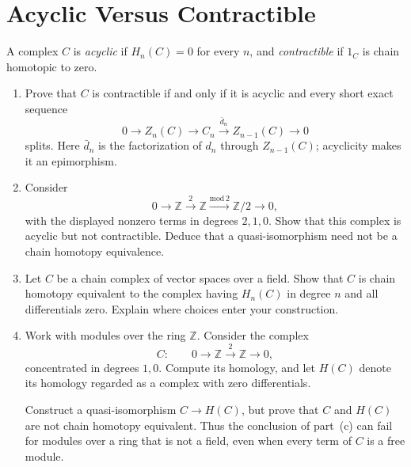 \documentclass[11pt]{article}
\newcommand{\Z}{\mathbb{Z}}
\begin{document}
\section{Acyclic Versus Contractible}
A complex \(C\) is \emph{acyclic} if \(H_n(C)=0\) for every \(n\), and
\emph{contractible} if \(1_C\) is chain homotopic to zero.
\begin{enumerate}
\item Prove that \(C\) is contractible if and only if it is acyclic and
every short exact sequence
\[
0\longrightarrow Z_n(C)\longrightarrow C_n
\xrightarrow{\bar{d}_n}Z_{n-1}(C)\longrightarrow0
\]
splits. Here \(\bar{d}_n\) is the factorization of \(d_n\) through
\(Z_{n-1}(C)\); acyclicity makes it an epimorphism.

\item Consider
\[
0\longrightarrow\Z\xrightarrow{\,2\,}\Z
\xrightarrow{\mathrm{mod}\,2}\Z/2\longrightarrow0,
\]
with the displayed nonzero terms in degrees \(2,1,0\). Show that this
complex is acyclic but not contractible. Deduce that a quasi-isomorphism
need not be a chain homotopy equivalence.

\item Let \(C\) be a chain complex of vector spaces over a field. Show
that \(C\) is chain homotopy equivalent to the complex having \(H_n(C)\)
in degree \(n\) and all differentials zero. Explain where choices enter
your construction.

\item Work with modules over the ring \(\Z\). Consider the complex
\[
C:\qquad 0\longrightarrow\Z\xrightarrow{\,2\,}\Z\longrightarrow0,
\]
concentrated in degrees \(1,0\). Compute its homology, and let \(H(C)\)
denote its homology regarded as a complex with zero differentials.

Construct a quasi-isomorphism \(C\to H(C)\), but prove that \(C\) and
\(H(C)\) are not chain homotopy equivalent. Thus the conclusion of
part~(c) can fail for modules over a ring that is not a field, even when
every term of \(C\) is a free module.
\end{enumerate}
\end{document}

